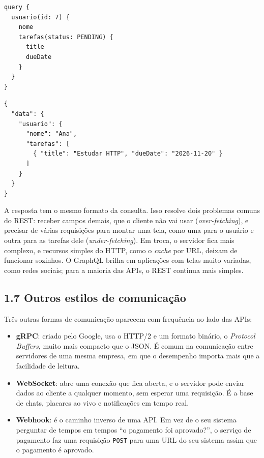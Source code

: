 \begin{codigo}
\begin{Verbatim}[breaklines=true, breaksymbolleft={}, fontsize=\footnotesize]
query {
  usuario(id: 7) {
    nome
    tarefas(status: PENDING) {
      title
      dueDate
    }
  }
}
\end{Verbatim}
\end{codigo}

\begin{codigo}
\begin{Verbatim}[breaklines=true, breaksymbolleft={}, fontsize=\footnotesize]
{
  "data": {
    "usuario": {
      "nome": "Ana",
      "tarefas": [
        { "title": "Estudar HTTP", "dueDate": "2026-11-20" }
      ]
    }
  }
}
\end{Verbatim}
\end{codigo}

A resposta tem o mesmo formato da consulta. Isso resolve dois problemas comuns do REST: receber campos demais, que o cliente não vai usar (\textit{over-fetching}), e precisar de várias requisições para montar uma tela, como uma para o usuário e outra para as tarefas dele (\textit{under-fetching}). Em troca, o servidor fica mais complexo, e recursos simples do HTTP, como o \textit{cache} por URL, deixam de funcionar sozinhos. O GraphQL brilha em aplicações com telas muito variadas, como redes sociais; para a maioria das APIs, o REST continua mais simples.

\subsection{1.7 Outros estilos de comunicação}

Três outras formas de comunicação aparecem com frequência ao lado das APIs:

\begin{itemize}
  \item \textbf{gRPC}: criado pelo Google, usa o HTTP/2 e um formato binário, o \textit{Protocol Buffers}, muito mais compacto que o JSON. É comum na comunicação entre servidores de uma mesma empresa, em que o desempenho importa mais que a facilidade de leitura.
  \item \textbf{WebSocket}: abre uma conexão que fica aberta, e o servidor pode enviar dados ao cliente a qualquer momento, sem esperar uma requisição. É a base de chats, placares ao vivo e notificações em tempo real.
  \item \textbf{Webhook}: é o caminho inverso de uma API. Em vez de o seu sistema perguntar de tempos em tempos ``o pagamento foi aprovado?'', o serviço de pagamento faz uma requisição \texttt{POST} para uma URL do seu sistema assim que o pagamento é aprovado.
\end{itemize}

